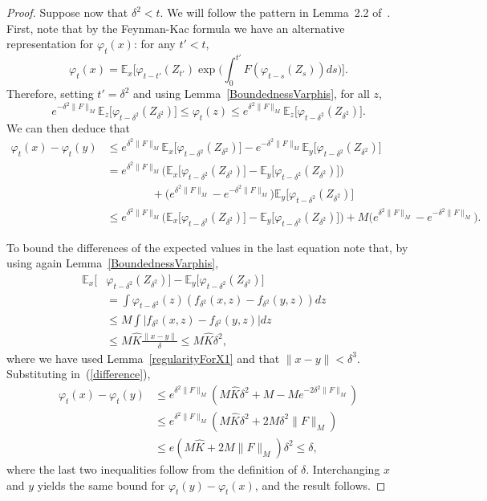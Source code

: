 \documentclass[EJP]{ejpecp} %
\newcommand{\IE}{\mathbb E}
\begin{document}
\begin{proof}
Suppose now that $\delta^2<t$.
We will follow the pattern in Lemma~2.2 of~\cite{penington:2017}. 
First, note that by the Feynman-Kac formula we have an alternative 
representation for $\varphi_t(x)$: for any $t'<t$,
\[ 
\varphi_t(x) = \IE_x\Big[ \varphi_{t-t'}(Z_{t'}) 
\exp\big( \int_0^{t'} F(\varphi_{t-s}(Z_s)) ds \big) \Big]. 
\]
Therefore, setting $t'=\delta^2$ and using Lemma~\ref{BoundednessVarphis}, for all $z$,
\[ 
e^{-\delta^2\| F \|_{M}}\IE_z\big[ \varphi_{t-\delta^2}(Z_{\delta^2})\big] 
\leq  
\varphi_t(z) 
\leq e^{\delta^2\| F \|_{M}} \IE_z\big[  \varphi_{t-\delta^2}(Z_{\delta^2})\big]. 
\]
We can then deduce that
\begin{align}
\nonumber
\varphi_t(x)-\varphi_t(y) 
&\leq e^{\delta^2\| F \|_{M}}\IE_x\big[ \varphi_{t-\delta^2}(Z_{\delta^2})\big] 
- e^{-\delta^2\| F \|_{M}}\IE_y\big[ \varphi_{t-\delta^2}(Z_{\delta^2})\big] 
\\ 
\nonumber
& = e^{\delta^2\| F \|_{M}}
\Big(\IE_x\big[ \varphi_{t-\delta^2}(Z_{\delta^2})\big]
- \IE_y\big[ \varphi_{t-\delta^2}(Z_{\delta^2})\big]\Big) 
\\ 
\nonumber
&\qquad \qquad 
+ \big(e^{\delta^2\| F \|_{M}} - e^{-\delta^2\| F \|_{M}}  \big)
\IE_y\big[ \varphi_{t-\delta^2}(Z_{\delta^2})\big] 
\\
\label{difference}
&\leq e^{\delta^2\| F \|_{M}} 
\Big(\IE_x\big[ \varphi_{t-\delta^2}(Z_{\delta^2})\big]- 
\IE_y\big[ \varphi_{t-\delta^2}(Z_{\delta^2})\big]) 
+ M\big(e^{\delta^2\| F \|_{M}}-e^{-\delta^2\| F \|_{M}}\big) .
\end{align}

To bound the differences of the expected values in the last equation 
note that, by using again Lemma~\ref{BoundednessVarphis},
\begin{align*}
\IE_x\big[ &\varphi_{t-\delta^2}(Z_{\delta^2})\big]
- \IE_y[ \varphi_{t-\delta^2}(Z_{\delta^2})\big] & \\ 
& = \int \varphi_{t-\delta^2}(z) (f_{\delta^2}(x,z)-f_{\delta^2}(y,z) ) dz  \\ 
&\leq M \int \big|f_{\delta^2}(x,z)-f_{\delta^2}(y,z) \big| dz \\ 
&\leq M \widehat{K} \frac{\|x-y\|}{\delta}  
\leq M \widehat{K} \delta^2, 
\end{align*}
where we have used Lemma~\ref{regularityForX1} and that $\|x-y\| < \delta^3$.
Substituting in~(\ref{difference}),
\begin{align*}
\varphi_t(x)-\varphi_t(y)
&\leq e^{\delta^2 \| F \|_{M}} 
\left(M \widehat{K}\delta^2 +M - M e^{-2\delta^2\| F \|_{M}}  \right) \\ 
& \leq e^{\delta^2 \| F \|_{M}}\left(M \widehat{K}\delta^2 
+ 2 M \delta^2\| F \|_{M}  \right) \\ 
&\leq e \left( M \widehat{K}+2 M \| F \|_M  \right) \delta^2 \leq  \delta,
\end{align*}
where the last two inequalities follow from the definition of $\delta$. 
Interchanging $x$ and $y$ yields the same bound for $\varphi_t(y)-\varphi_t(x)$, and the result 
follows.
\end{proof}
\end{document}
